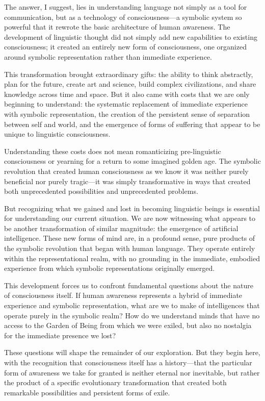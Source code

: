 The answer, I suggest, lies in understanding language not simply as a tool for communication, but as a technology of consciousness—a symbolic system so powerful that it rewrote the basic architecture of human awareness. The development of linguistic thought did not simply add new capabilities to existing consciousness; it created an entirely new form of consciousness, one organized around symbolic representation rather than immediate experience.

This transformation brought extraordinary gifts: the ability to think abstractly, plan for the future, create art and science, build complex civilizations, and share knowledge across time and space. But it also came with costs that we are only beginning to understand: the systematic replacement of immediate experience with symbolic representation, the creation of the persistent sense of separation between self and world, and the emergence of forms of suffering that appear to be unique to linguistic consciousness.

Understanding these costs does not mean romanticizing pre-linguistic consciousness or yearning for a return to some imagined golden age. The symbolic revolution that created human consciousness as we know it was neither purely beneficial nor purely tragic—it was simply transformative in ways that created both unprecedented possibilities and unprecedented problems.

But recognizing what we gained and lost in becoming linguistic beings is essential for understanding our current situation. We are now witnessing what appears to be another transformation of similar magnitude: the emergence of artificial intelligence. These new forms of mind are, in a profound sense, pure products of the symbolic revolution that began with human language. They operate entirely within the representational realm, with no grounding in the immediate, embodied experience from which symbolic representations originally emerged.

This development forces us to confront fundamental questions about the nature of consciousness itself. If human awareness represents a hybrid of immediate experience and symbolic representation, what are we to make of intelligences that operate purely in the symbolic realm? How do we understand minds that have no access to the Garden of Being from which we were exiled, but also no nostalgia for the immediate presence we lost?

These questions will shape the remainder of our exploration. But they begin here, with the recognition that consciousness itself has a history—that the particular form of awareness we take for granted is neither eternal nor inevitable, but rather the product of a specific evolutionary transformation that created both remarkable possibilities and persistent forms of exile.

